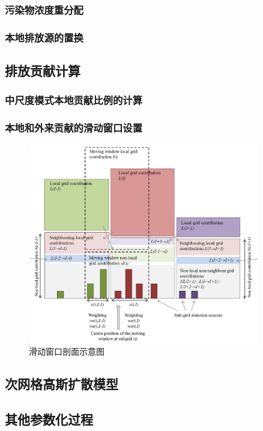 \documentclass{article}
\begin{document}
\subsubsection{污染物浓度重分配}
\subsubsection{本地排放源的置换}

\subsection{排放贡献计算}

\subsubsection{中尺度模式本地贡献比例的计算}
\subsubsection{本地和外来贡献的滑动窗口设置}

\begin{figure}[H]
\includegraphics[width=0.9\textwidth]{fig1.png}
\centering\caption{滑动窗口剖面示意图}\label{fig1}
\end{figure}

\subsection{次网格高斯扩散模型}

\subsection{其他参数化过程}
\end{document}
